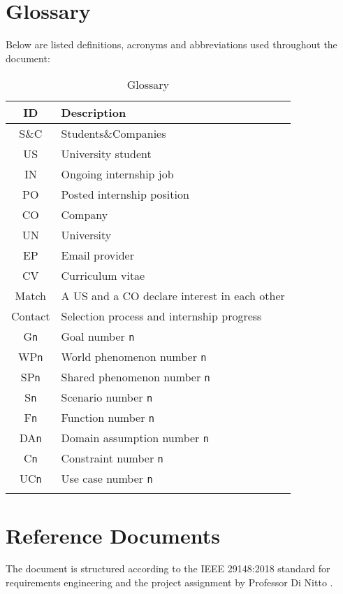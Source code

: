 \section{Glossary}
Below are listed definitions, acronyms and abbreviations used throughout the document:

\renewcommand{\arraystretch}{1.5}
\begin{longtable}{|c|p{8.5cm}|}
    \hline \rowcolor{polimiblue!40}
    \textbf{ID} & \textbf{Description} \\ \hline
    S\&C & Students\&Companies \\ \hline
    US & University student \\ \hline
    IN & Ongoing internship job \\ \hline
    PO & Posted internship position \\ \hline
    CO & Company \\ \hline
    UN & University \\ \hline
    EP & Email provider \\ \hline
    CV & Curriculum vitae \\ \hline
    Match & A US and a CO declare interest in each other \\ \hline
    Contact & Selection process and internship progress \\ \hline
    G\texttt{n} & Goal number \texttt{n} \\ \hline
    WP\texttt{n} & World phenomenon number \texttt{n} \\ \hline
    SP\texttt{n} & Shared phenomenon number \texttt{n} \\ \hline
    S\texttt{n} & Scenario number \texttt{n} \\ \hline
    F\texttt{n} & Function number \texttt{n} \\ \hline
    DA\texttt{n} & Domain assumption number \texttt{n} \\ \hline
    C\texttt{n} & Constraint number \texttt{n} \\ \hline
    UC\texttt{n} & Use case number \texttt{n} \\ \hline
\caption{Glossary}
\end{longtable}

\section{Reference Documents}
The document is structured according to the IEEE 29148:2018 standard for requirements engineering \cite{ieee2018} and the project assignment by Professor Di Nitto \cite{dinitto2024}.

